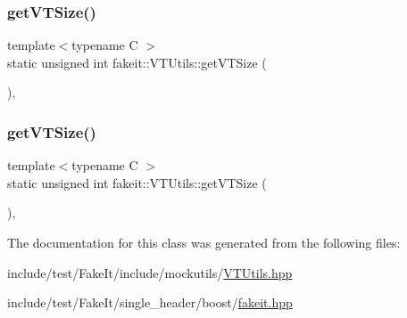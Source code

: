 \mbox{\label{classfakeit_1_1VTUtils_a54ddc7bb539671fbf957920f051a6104}} 
\subsubsection{\texorpdfstring{getVTSize()}{getVTSize()}\hspace{0.1cm}{\footnotesize\ttfamily [8/9]}}
{\footnotesize\ttfamily template$<$typename C $>$ \\
static unsigned int fakeit\+::\+V\+T\+Utils\+::get\+V\+T\+Size (\begin{DoxyParamCaption}{ }\end{DoxyParamCaption})\hspace{0.3cm}{\ttfamily [inline]}, {\ttfamily [static]}}

\mbox{\label{classfakeit_1_1VTUtils_a54ddc7bb539671fbf957920f051a6104}} 
\subsubsection{\texorpdfstring{getVTSize()}{getVTSize()}\hspace{0.1cm}{\footnotesize\ttfamily [9/9]}}
{\footnotesize\ttfamily template$<$typename C $>$ \\
static unsigned int fakeit\+::\+V\+T\+Utils\+::get\+V\+T\+Size (\begin{DoxyParamCaption}{ }\end{DoxyParamCaption})\hspace{0.3cm}{\ttfamily [inline]}, {\ttfamily [static]}}



The documentation for this class was generated from the following files\+:\begin{DoxyCompactItemize}
\item 
include/test/\+Fake\+It/include/mockutils/\mbox{\hyperlink{VTUtils_8hpp}{V\+T\+Utils.\+hpp}}\item 
include/test/\+Fake\+It/single\+\_\+header/boost/\mbox{\hyperlink{single__header_2boost_2fakeit_8hpp}{fakeit.\+hpp}}\end{DoxyCompactItemize}
